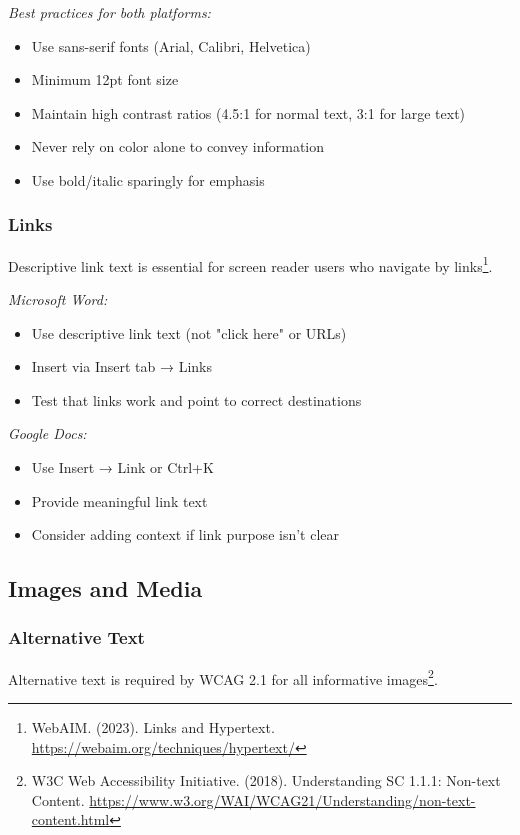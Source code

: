 \emph{Best practices for both platforms:}
\begin{itemize}
\item Use sans-serif fonts (Arial, Calibri, Helvetica)
\item Minimum 12pt font size
\item Maintain high contrast ratios (4.5:1 for normal text, 3:1 for large text)
\item Never rely on color alone to convey information
\item Use bold/italic sparingly for emphasis
\end{itemize}

\subsubsection{Links}
Descriptive link text is essential for screen reader users who navigate by links\footnote{WebAIM. (2023). Links and Hypertext. \url{https://webaim.org/techniques/hypertext/}}.

\emph{Microsoft Word:}
\begin{itemize}
\item Use descriptive link text (not "click here" or URLs)
\item Insert via Insert tab → Links
\item Test that links work and point to correct destinations
\end{itemize}

\emph{Google Docs:}
\begin{itemize}
\item Use Insert → Link or Ctrl+K
\item Provide meaningful link text
\item Consider adding context if link purpose isn't clear
\end{itemize}

\subsection{Images and Media}

\subsubsection{Alternative Text}
Alternative text is required by WCAG 2.1 for all informative images\footnote{W3C Web Accessibility Initiative. (2018). Understanding SC 1.1.1: Non-text Content. \url{https://www.w3.org/WAI/WCAG21/Understanding/non-text-content.html}}.

